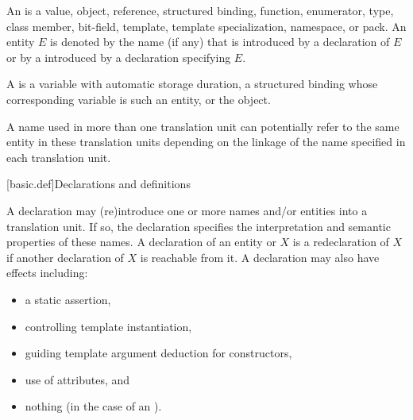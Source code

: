 \pnum
An  is a value, object, reference,
structured binding,
function, enumerator, type,
class member, bit-field, template, template specialization, namespace, or
pack. An entity $E$ is denoted by the name (if any)
that is introduced by a declaration of $E$ or
by a  introduced by a declaration specifying $E$.

\pnum
A  is a variable with
automatic storage duration,
a structured binding
whose corresponding variable is such an entity,
or the  object.

\pnum
{}%
%
A name used in more than one translation unit can potentially
refer to the same entity in these translation units depending on the
linkage of the name specified in each
translation unit.

[basic.def]{Declarations and definitions}

\pnum
{}%
%
%
A declaration may (re)introduce
one or more names and/or entities into a translation
unit.
If so, the
declaration specifies the interpretation and semantic properties of these names.
A declaration of an entity or  $X$ is
a redeclaration of $X$
if another declaration of $X$ is reachable from it.
A declaration may also have effects including:
\begin{itemize}
\item a static assertion,
\item controlling template instantiation,
\item guiding template argument deduction for constructors,
\item use of attributes, and
\item nothing (in the case of an ).
\end{itemize}

